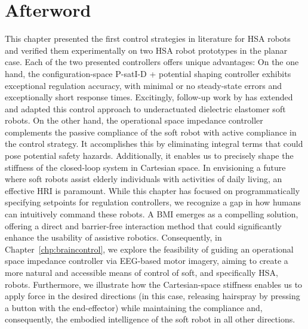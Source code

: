 \section*{Afterword}
This chapter presented the first control strategies in literature for \gls{HSA} robots and verified them experimentally on two \gls{HSA} robot prototypes in the planar case.
Each of the two presented controllers offers unique advantages:
On the one hand, the configuration-space P-satI-D + potential shaping controller exhibits exceptional regulation accuracy, with minimal or no steady-state errors and exceptionally short response times.
Excitingly, follow-up work by \citet{soleti2025model} has extended and adapted this control approach to underactuated dielectric elastomer soft robots.
On the other hand, the operational space impedance controller complements the passive compliance of the soft robot with active compliance in the control strategy. It accomplishes this by eliminating integral terms that could pose potential safety hazards. Additionally, it enables us to precisely shape the stiffness of the closed-loop system in Cartesian space.
In envisioning a future where soft robots assist elderly individuals with activities of daily living, an effective \gls{HRI} is paramount. While this chapter has focused on programmatically specifying setpoints for regulation controllers, we recognize a gap in how humans can intuitively command these robots. A \gls{BMI} emerges as a compelling solution, offering a direct and barrier-free interaction method that could significantly enhance the usability of assistive robotics. Consequently, in Chapter~\ref{chp:braincontrol}, we explore the feasibility of guiding an operational space impedance controller via \gls{EEG}-based motor imagery, aiming to create a more natural and accessible means of control of soft, and specifically \gls{HSA}, robots.
Furthermore, we illustrate how the Cartesian-space stiffness enables us to apply force in the desired directions (in this case, releasing hairspray by pressing a button with the end-effector) while maintaining the compliance and, consequently, the embodied intelligence of the soft robot in all other directions.